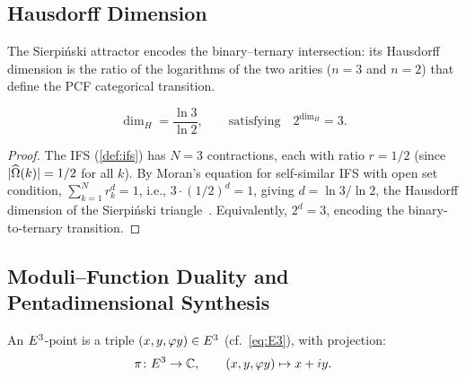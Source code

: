 \subsection{Hausdorff Dimension}\label{ssec:hausdorff}

The Sierpi\'nski attractor encodes the binary--ternary intersection: its
Hausdorff dimension is the ratio of the logarithms of the two arities
($n=3$ and $n=2$) that define the PCF categorical transition.

\begin{Proposition}%
  \label{prop:hausdorff}
\begin{equation}\label{eq:hausdorff-dim}
  \dim_H = \frac{\ln 3}{\ln 2},
  \qquad\text{satisfying}\quad
  2^{\dim_H} = 3.
\end{equation}
\end{Proposition}

\begin{proof}
The IFS (\cref{def:ifs}) has $N=3$ contractions, each with
ratio $r=1/2$ (since $|\widehat{\Omega}(k)|=1/2$ for all $k$).  By Moran's equation
for self-similar IFS with open set condition,
$\sum_{k=1}^N r_k^d = 1$, i.e., $3\cdot(1/2)^d = 1$, giving
$d = \ln 3/\ln 2$, the Hausdorff dimension of the Sierpi\'nski triangle~\cite{mandelbrot82}. Equivalently, $2^d = 3$, encoding the
binary-to-ternary transition.
\end{proof}


\subsection{Moduli--Function Duality and Pentadimensional Synthesis}%
  \label{ssec:synthesis}

\begin{Definition}\label{def:E3-point}
An $E^3$-point is a triple $(x,y,\varphi y)\in E^3$
(cf.~\cref{eq:E3}), with projection:
\begin{equation}\label{eq:proj-E3-to-C}
  \pi\colon E^3\to\mathbb{C}, \qquad
  (x,y,\varphi y)\mapsto x + iy.
\end{equation}
\end{Definition}

